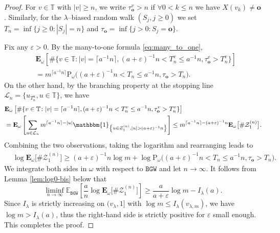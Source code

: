 \documentclass[11 pt]{article}
\theoremstyle{definition}
\numberwithin{equation}{section}
\newcommand{\TT}{\mathbb{T}} %
\newcommand{\ind}[1]{\mathbbm{1}_{\left\{ #1 \right\} } } %
\newcommand{\EE}{\mathbb{E}} %
\newcommand{\rt}{\mathbf{o}} %
\newcommand{\Ew}{\mathbf{E}_{\omega}} %
\newcommand{\Pws}{\mathrm{P}_{\omega}} %
\begin{document}
\begin{proof}
	For $v\in \TT$ with $\vert v\vert\ge n$, we write $\tau_\rt^v > n$ if $\forall 0< k\leq n$  
	we have $X(v_k)\neq \rt$. Similarly, for the $\lambda$--biased random walk $(S_j, j\geq 0)$ we set $T_n = \inf\{j\ge 0\colon |S_j|=n  \}$ and $\tau_{\rt} = \inf\{j > 0\colon S_j = \rt  \}$.  
	
	Fix any $\varepsilon>0$. By the many-to-one formula \eqref{eq:many_to_one},
	\begin{align*}
		  & \Ew\left[	\# \{v\in \TT\colon |v|= \lceil a^{-1} n\rceil , (a+\varepsilon)^{-1}n<T^v_{n } \le a^{-1} n  , \tau^v_\rt >T^v_{n}  \} \right] \\
		& = m^{ \lceil a^{-1}  n\rceil } \Pws\big( (a+\varepsilon)^{-1}n< T_{n } \le a^{-1} n, \tau_\rt >T_{n}  \big). 
	\end{align*} 
On the other hand, by the branching property at the stopping line 
$\mathcal{L}_{n}=\{u_{T^u_{n }}, u\in \TT \}$, we have 
\begin{align*}
	&\Ew\left[\# \{v\in \TT\colon  |v|= \lceil a^{-1} n\rceil ,(a+\varepsilon)^{-1}n<T^v_{n } \le a^{-1} n , \tau^v_\rt >T^v_{n}  \} \right] \\
	&= \Ew\left[	\sum_{u\in \mathcal{L}_n } m^{\lceil a^{-1} n \rceil - |u|} \ind{u\in\mathcal{Z}^{(n)}_1 , |u|>  (a+\varepsilon)^{-1}n} \right] 
		\leq m^{\lceil a^{-1}n \rceil- (a+\varepsilon)^{-1}n}\Ew\big[	\# \mathcal{Z}^{(n)}_1 \big].
\end{align*}
Combining the two observations, taking the logarithm and rearranging leads to
	\begin{align}\label{eq:lem-log-Z1}
	&	\log\Ew\big[	\# \mathcal{Z}^{(n)}_1\big]
		\ge (a+\varepsilon)^{-1} n \log m + \log  \Pws\big( (a+\varepsilon)^{-1}n< T_{n } \le a^{-1} n, \tau_\rt >T_{n}  \big) . 
	\end{align}
 We integrate both sides in $\omega$ with respect to $\mathtt{BGW}$ and let $n\to \infty$.  
It follows from Lemma \ref{lem:log0-bis} below  that
\begin{equation}
	\liminf_{n \to \infty}\EE_{\mathtt{BGW}} \left[ \frac{a}{n} \log \Ew\big[\# \mathcal{Z}^{(n)}_1\big]\right] \ge \frac{a}{a+\varepsilon} \log m -I_{\lambda} (a).\label{eq:rw-ldp}
\end{equation}
Since $I_{\lambda}$ is strictly increasing on $(v_{\lambda},1]$ with $\log m \leq I_{\lambda}(v_{\lambda, m})$, we have  $\log m> I_{\lambda}(a)$, thus the right-hand side is strictly positive for $\varepsilon$ small enough. 
This completes the proof.
\end{proof}
\end{document}
